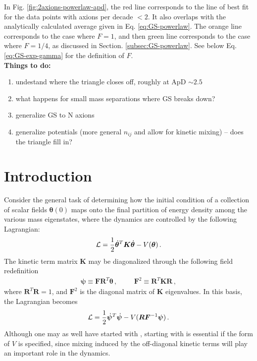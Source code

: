 \documentclass{article}
\begin{document}
In Fig. \ref{fig:2axions-powerlaw-apd}, the red line corresponds to the line of best fit for the data points with axions per decade $<2$. It also overlaps with the analytically calculated average given in Eq. \eqref{eq:GS-powerlaw}. The orange line corresponds to the case where $F=1$, and then green line corresponds to the case where $F=1/4$, as discussed in Section. \ref{subsec:GS-powerlaw}. See below Eq. \eqref{eq:GS-exp-gamma} for the definition of $F$. \\

\color{red}\noindent \textbf{Things to do:}
\begin{enumerate}
    \item undestand where the triangle closes off, roughly at ApD $\sim 2.5$
    \item what happens for small mass separations where GS breaks down?
    \item generalize GS to N axions
    \item generalize potentials (more general $n_{ij}$ and allow for kinetic mixing) – does the triangle fill in?
\end{enumerate}\color{black}

\appendix
\section{Introduction}
Consider the general task of determining how the initial condition of a collection of scalar fields $\bm \theta(0)$ maps onto the final partition of energy density among the various mass eigenstates, where the dynamics are controlled by the following Lagrangian:
\begin{align}\label{eqn:fundamental}
    {\cal L} = \frac{1}{2}\dot{\bm \theta}^T {\bm K}\dot{\bm\theta} - V(\bm\theta)\,.
\end{align}
The kinetic term matrix $\bm K$ may be diagonalized through the following field redefinition
\begin{align}
    \bm\psi \equiv \bm F \bm R^T \bm\theta\,,\hspace{1cm}\bm F^2\equiv \bm R^T \bm K \bm R\,,
\end{align}
where $\bm R^T \bm R  = 1$, and $\bm F^2$ is the diagonal matrix of $\bm K$ eigenvalues. In this basis, the Lagrangian becomes
\begin{align}\label{eqn:canonical}
    {\cal L} = \frac12\dot{\bm\psi}^T\dot{\bm\psi} - V(\bm R\bm F^{-1}\bm\psi)\,.
\end{align}
Although one may as well have started with , starting with  is essential if the form of $V$ is specified, since mixing induced by the off-diagonal kinetic terms will play an important role in the dynamics.
\end{document}

